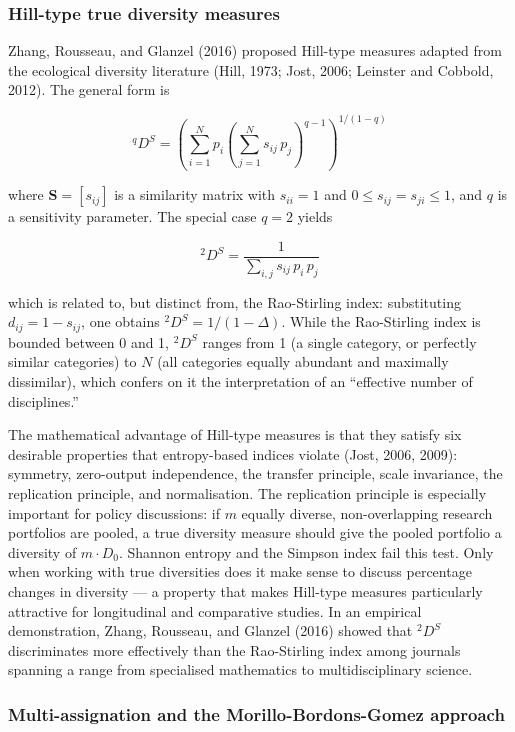 \documentclass[
]{article}
\begin{document}
\hypertarget{hill-type-true-diversity-measures}{%
\subsubsection{Hill-type true diversity
measures}\label{hill-type-true-diversity-measures}}

Zhang, Rousseau, and Glanzel (2016) proposed Hill-type measures adapted
from the ecological diversity literature (Hill, 1973; Jost, 2006;
Leinster and Cobbold, 2012). The general form is

\[{}^qD^S = \left( \sum_{i=1}^{N} p_i \left( \sum_{j=1}^{N} s_{ij}\, p_j \right)^{q-1} \right)^{1/(1-q)}\]

where \(\mathbf{S} = [s_{ij}]\) is a similarity matrix with
\(s_{ii} = 1\) and \(0 \le s_{ij} = s_{ji} \le 1\), and \(q\) is a
sensitivity parameter. The special case \(q = 2\) yields

\[{}^2D^S = \frac{1}{\sum_{i,j} s_{ij}\, p_i\, p_j}\]

which is related to, but distinct from, the Rao-Stirling index:
substituting \(d_{ij} = 1 - s_{ij}\), one obtains
\({}^2D^S = 1/(1 - \Delta)\). While the Rao-Stirling index is bounded
between 0 and 1, \({}^2D^S\) ranges from 1 (a single category, or
perfectly similar categories) to \(N\) (all categories equally abundant
and maximally dissimilar), which confers on it the interpretation of an
``effective number of disciplines.''

The mathematical advantage of Hill-type measures is that they satisfy
six desirable properties that entropy-based indices violate (Jost, 2006,
2009): symmetry, zero-output independence, the transfer principle, scale
invariance, the replication principle, and normalisation. The
replication principle is especially important for policy discussions: if
\(m\) equally diverse, non-overlapping research portfolios are pooled, a
true diversity measure should give the pooled portfolio a diversity of
\(m \cdot D_0\). Shannon entropy and the Simpson index fail this test.
Only when working with true diversities does it make sense to discuss
percentage changes in diversity --- a property that makes Hill-type
measures particularly attractive for longitudinal and comparative
studies. In an empirical demonstration, Zhang, Rousseau, and Glanzel
(2016) showed that \({}^2D^S\) discriminates more effectively than the
Rao-Stirling index among journals spanning a range from specialised
mathematics to multidisciplinary science.

\hypertarget{multi-assignation-and-the-morillo-bordons-gomez-approach}{%
\subsubsection{Multi-assignation and the Morillo-Bordons-Gomez
approach}\label{multi-assignation-and-the-morillo-bordons-gomez-approach}}
\end{document}
